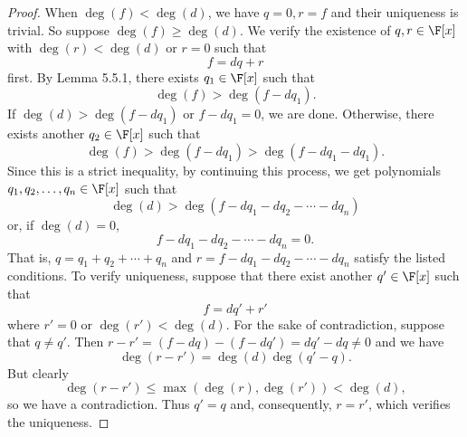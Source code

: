 \documentclass[linearalgebra]{subfiles}
\begin{document}
    \begin{proof}
        When $\deg(f) < \deg(d)$, we have $q=0, r=f$ and their uniqueness is trivial. So suppose $\deg(f)\geq\deg(d)$. We verify the existence of $q, r\in \F[x]$ with $\deg(r)<\deg(d)$ or $r=0$ such that
        \begin{equation*}
            f = dq+r
        \end{equation*}
        first. By Lemma 5.5.1, there exists $q_1\in \F[x]$ such that
        \begin{equation*}
            \deg(f) > \deg(f-dq_1).
        \end{equation*}
        If $\deg(d) > \deg(f-dq_1)$ or $f-dq_1 = 0$, we are done. Otherwise, there exists another $q_2\in \F[x]$ such that
        \begin{equation*}
            \deg(f) > \deg(f-dq_1) > \deg(f-dq_1-dq_1).
        \end{equation*}
        Since this is a strict inequality, by continuing this process, we get polynomials $q_1, q_2, \ldots, q_n\in \F[x]$ such that
        \begin{equation*}
            \deg(d) > \deg(f-dq_1-dq_2-\cdots-dq_n)
        \end{equation*}
        or, if $\deg(d) = 0$,
        \begin{equation*}
            f - dq_1 - dq_2 - \cdots - dq_n = 0.
        \end{equation*}
        That is, $q = q_1+q_2+\cdots+q_n$ and $r = f-dq_1-dq_2-\cdots-dq_n$ satisfy the listed conditions. To verify uniqueness, suppose that there exist another $q'\in \F[x]$ such that
        \begin{equation*}
            f = dq'+r'
        \end{equation*}
        where $r' = 0$ or $\deg(r')<\deg(d)$. For the sake of contradiction, suppose that $q\neq q'$. Then $r-r' = (f-dq)-(f-dq') = dq'-dq \neq 0$ and we have
        \begin{equation*}
            \deg(r-r') = \deg(d)\deg(q'-q).
        \end{equation*}
        But clearly
        \begin{equation*}
            \deg(r-r') \leq \max(\deg(r), \deg(r')) < \deg(d),
        \end{equation*}
        so we have a contradiction. Thus $q'=q$ and, consequently, $r=r'$, which verifies the uniqueness.
    \end{proof}
\end{document}
